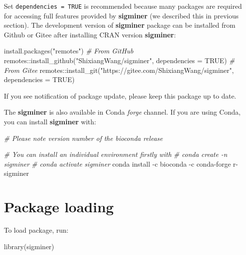 \documentclass[
  12pt,
  a4paper,
  twoside]{book}
\newenvironment{Shaded}{\begin{snugshade}}{\end{snugshade}}
\newcommand{\AttributeTok}[1]{\textcolor[rgb]{0.77,0.63,0.00}{#1}}
\newcommand{\CommentTok}[1]{\textcolor[rgb]{0.56,0.35,0.01}{\textit{#1}}}
\newcommand{\ConstantTok}[1]{\textcolor[rgb]{0.00,0.00,0.00}{#1}}
\newcommand{\FunctionTok}[1]{\textcolor[rgb]{0.00,0.00,0.00}{#1}}
\newcommand{\NormalTok}[1]{#1}
\newcommand{\SpecialCharTok}[1]{\textcolor[rgb]{0.00,0.00,0.00}{#1}}
\newcommand{\StringTok}[1]{\textcolor[rgb]{0.31,0.60,0.02}{#1}}
\begin{document}
Set \texttt{dependencies\ =\ TRUE} is recommended because many packages are required for accessing full features provided by \textbf{sigminer} (we described this in previous section).
The development version of \textbf{sigminer} package can be installed from Github or Gitee after installing CRAN version \textbf{sigminer}:

\begin{Shaded}
\begin{Highlighting}[]
\FunctionTok{install.packages}\NormalTok{(}\StringTok{"remotes"}\NormalTok{)}
\CommentTok{\# From GitHub}
\NormalTok{remotes}\SpecialCharTok{::}\FunctionTok{install\_github}\NormalTok{(}\StringTok{"ShixiangWang/sigminer"}\NormalTok{, }\AttributeTok{dependencies =} \ConstantTok{TRUE}\NormalTok{)}
\CommentTok{\# From Gitee}
\NormalTok{remotes}\SpecialCharTok{::}\FunctionTok{install\_git}\NormalTok{(}\StringTok{"https://gitee.com/ShixiangWang/sigminer"}\NormalTok{, }\AttributeTok{dependencies =} \ConstantTok{TRUE}\NormalTok{)}
\end{Highlighting}
\end{Shaded}

If you see notification of package update, please keep this package up to date.

The \textbf{sigminer} is also available in Conda \emph{forge} channel. If you are using Conda,
you can install \textbf{sigminer} with:

\begin{Shaded}
\begin{Highlighting}[]
\CommentTok{\# Please note version number of the bioconda release}

\CommentTok{\# You can install an individual environment firstly with}
\CommentTok{\# conda create {-}n sigminer}
\CommentTok{\# conda activate sigminer}
\NormalTok{conda install }\SpecialCharTok{{-}}\NormalTok{c bioconda }\SpecialCharTok{{-}}\NormalTok{c conda}\SpecialCharTok{{-}}\NormalTok{forge r}\SpecialCharTok{{-}}\NormalTok{sigminer}
\end{Highlighting}
\end{Shaded}

\hypertarget{package-loading}{%
\section{Package loading}\label{package-loading}}

To load package, run:

\begin{Shaded}
\begin{Highlighting}[]
\FunctionTok{library}\NormalTok{(sigminer)}
\end{Highlighting}
\end{Shaded}
\end{document}

